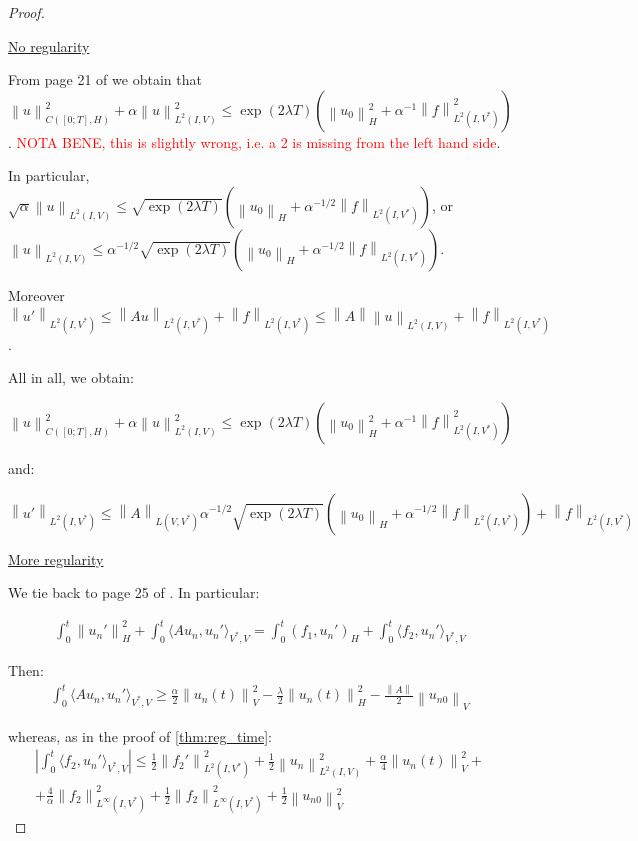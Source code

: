 \documentclass[english,a4paper,9pt,oneside]{scrbook}	%
\theoremstyle{break}
\newenvironment{mproof}[1][\proofname]{%
  \begin{proof}[#1]$ $\par\nobreak\ignorespaces
}{%
  \end{proof}
}
\renewcommand*{\proofname}{Proof}
\theoremstyle{remark}
\newcommand{\norm}[1]{\left\lVert#1\right\rVert}
\newcommand{\HN}[1]{\norm{#1}_{H}}
\newcommand{\VN}[1]{\norm{#1}_{V}}
\begin{document}
\begin{appendices}
\begin{mproof}
\underline{No regularity}

From page 21 of \cite{gilardi} we obtain that $\norm{u}^2_{C([0;T],H)}+\alpha\norm{u}_{L^2(I,V)}^2\leq \exp(2\lambda T)(\HN{u_0}^2+\alpha^{-1}\norm{f}^2_{L^2(I,V^*)})$. \textcolor{red}{NOTA BENE, this is slightly wrong, i.e. a 2 is missing from the left hand side}.

In particular, $\sqrt{\alpha}\norm{u}_{L^2(I,V)}\leq 	\sqrt{\exp(2\lambda T)}(\HN{u_0}+\alpha^{-1/2}\norm{f}_{L^2(I,V^*)})$, or $\norm{u}_{L^2(I,V)}\leq 	\alpha^{-1/2}\sqrt{\exp(2\lambda T)}(\HN{u_0}+\alpha^{-1/2}\norm{f}_{L^2(I,V^*)})$.

Moreover $\norm{u'}_{L^2(I,V^*)}\leq \norm{Au}_{L^2(I,V^*)}+\norm{f}_{L^2(I,V^*)}\leq \norm{A}\norm{u}_{L^2(I,V)}+\norm{f}_{L^2(I,V^*)}$.

All in all, we obtain:

$$\norm{u}^2_{C([0;T],H)}+\alpha\norm{u}_{L^2(I,V)}^2\leq \exp(2\lambda T)(\HN{u_0}^2+\alpha^{-1}\norm{f}^2_{L^2(I,V^*)})$$

and:

$$\norm{u'}_{L^2(I,V^*)}\leq \norm{A}_{L(V,V^*)}	\alpha^{-1/2}\sqrt{\exp(2\lambda T)}(\HN{u_0}+\alpha^{-1/2}\norm{f}_{L^2(I,V^*)})+\norm{f}_{L^2(I,V^*)}$$

\underline{More regularity}

We tie back to page 25 of \cite{gilardi}. In particular:

\begin{align*}
\int_0^t\HN{u_n'}^2+\int_0^t\langle A u_n, u_n'\rangle_{V^*,V}=\int_0^t(f_1,u_n')_H+\int_0^t \langle f_2, u_n'\rangle_{V^*,V}
\end{align*}


Then:
\begin{align*}
\int_0^t\langle A u_n, u_n'\rangle_{V^*,V}\geq \frac{\alpha}{2}\VN{u_n(t)}^2-\frac{\lambda}{2}\HN{u_n(t)}^2-\frac{\norm{A}}{2}\VN{u_{n0}}
\end{align*}

whereas, as in the proof of \cref{thm:reg_time}:
\begin{align*}
	\left | \int_0^t \langle f_2,u_n' \rangle_{V^*,V}\right | \leq
	\frac{1}{2}\norm{f_2'}_{L^2(I,V^*)}^2 + \frac{1}{2}\norm{u_n}_{L^2(I,V)}^2 + \frac{\alpha}{4}\VN{u_n(t)}^2 +\\
	+ \frac{4}{\alpha}\norm{f_2}_{L^\infty(I,V^*)}^2+ \frac{1}{2}\norm{f_2}_{L^\infty(I,V^*)}^2+\frac{1}{2}\VN{u_{n0}}^2
\end{align*}


\end{mproof}
\end{appendices}
\end{document}
